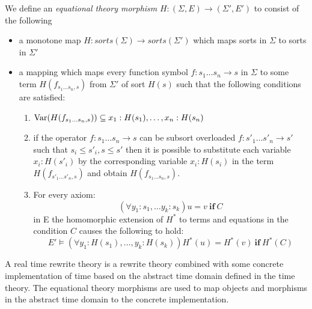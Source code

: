 \begin{mydef}
 We define an \emph{equational theory morphism} $H: (\Sigma,E) \to (\Sigma', E')$ to consist of the following
\begin{itemize}
\item a monotone map $H:sorts(\Sigma) \to sorts(\Sigma')$ which maps  sorts in $\Sigma$  to sorts in $\Sigma'$

\item a mapping which maps every function symbol $f : s_1 \ldots s_n \to s$ in $\Sigma$ to some term $H(f_{s_1 \ldots s_n, s})$ from $\Sigma'$ of sort $H(s)$ such that the following conditions are satisfied:
\begin{enumerate}

\item  $\mathrm{Var}(H(f_{s_1 \ldots s_n, s})) \subseteq {x_1:H(s_1), \ldots, x_n:H(s_n)}$

\item if the operator $f: s_1 \ldots s_n \to s$ can be subsort overloaded $f: s'_1 \ldots s'_n \to s'$ such that $s_i \leq s'_i, s\leq s'$ then it is possible to substitute each variable $x_i:H(s'_i)$ by the corresponding variable $x_i:H(s_i)$ in the term $H(f_{s'_1 \ldots s'_n, s})$ and obtain $H(f_{s_1 \ldots s_n, s})$.

\item For every axiom: $$(\forall y_1:s_1, \ldots y_k : s_k) u = v \ \textbf{if} \ C$$ in E the homomorphic extension of $H^*$ to terms and equations in the condition $C$ causes the following to hold:
   $$E' \models (\forall y_1 : H(s_1), \ldots, y_k : H(s_k)) H^*(u) = H^*(v) \ \textbf{if} \ H^*(C)$$

\end{enumerate}

\end{itemize}

\end{mydef}
\medskip

A real time rewrite theory is a rewrite theory combined with some concrete implementation of time based on the abstract time domain defined in the time theory. The equational theory morphisms are used to map objects and morphisms in the abstract time domain to the concrete implementation.

